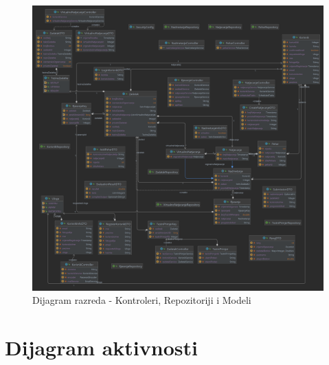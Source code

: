 \begin{figure}[H]
	\includegraphics[scale=0.15]{dijagrami/apiDiagram.png}
	\centering
	\caption{Dijagram razreda - Kontroleri, Repozitoriji i Modeli}
	\label{fig:dijagramRazreda2}
\end{figure}

%
%
%
%
%
%
%
%
%
%
%
\section{Dijagram aktivnosti}

